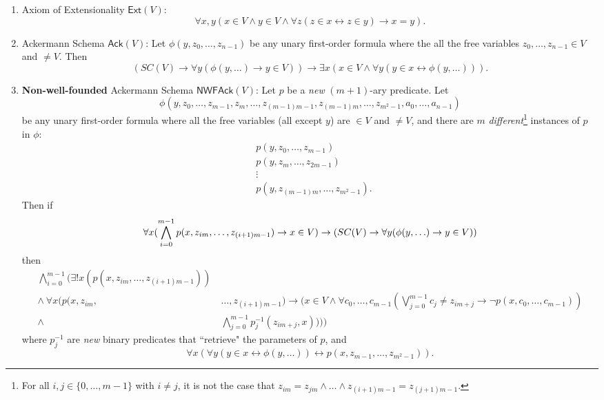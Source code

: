 \documentclass{article}
\begin{document}
\begin{enumerate}
	\item Axiom of Extensionality $\textsf{Ext}(V)$: $$\forall x, y (x \in V \wedge y \in V \wedge \forall z(z\in x \leftrightarrow z \in y) \rightarrow x = y).$$
	\item Ackermann Schema $\textsf{Ack}(V)$: Let $\phi(y, z_0, \ldots, z_{n-1})$ be any unary first-order formula where the all the free variables $z_0, \ldots, z_{n-1} \in V$ and $\ne V$. Then $$(SC(V) \rightarrow \forall y(\phi(y, \ldots) \rightarrow y \in V)) \rightarrow \exists x(x \in V \wedge \forall y(y \in x \leftrightarrow \phi(y, \ldots))).$$
    \item \textbf{Non-well-founded} Ackermann Schema $\textsf{NWFAck}(V)$: Let $p$ be a \textit{new} $(m+1)$-ary predicate. Let $$\phi(y, z_0, \ldots, z_{m-1}, z_{m}, \ldots, z_{(m-1)m-1}, z_{(m-1)m}, \ldots, z_{m^2-1}, a_0, \ldots, a_{n-1})$$ be any unary first-order formula where all the free variables (all except $y$) are $\in V$ and $\ne V$, and there are $m$ \textit{different}\footnote{For all $i,j \in \{0, \ldots, m-1\}$ with $i \ne j$, it is not the case that $z_{im} = z_{jm} \wedge \ldots \wedge z_{(i+1)m-1} = z_{(j+1)m-1}$.} instances of $p$ in $\phi$:
\begin{align*}
&p(y, z_0, \ldots, z_{m-1}) \\ &p(y, z_m, \ldots, z_{2m-1}) \\ &\vdots \\ &p(y, z_{(m-1)m}, \ldots, z_{m^2-1}).
\end{align*}
Then if
$$\forall x(\bigwedge_{i=0}^{m-1}{p(x, z_{im}, \ldots, z_{(i+1)m-1})}\rightarrow x \in V) \rightarrow \\ (SC(V) \rightarrow \forall y(\phi(y, \ldots) \rightarrow y \in V))$$
then
\begin{align*}
\bigwedge_{i=0}^{m-1}\Big(\exists!x(p(x, z_{im}, \ldots, z_{(i+1)m-1}))\ &  \\ \wedge\ \forall x(p(x, z_{im}, & \ldots, z_{(i+1)m-1}) \rightarrow (x \in V \wedge \forall c_0, \ldots, c_{m-1} (\bigvee_{j=0}^{m-1} {c_j \ne z_{im+j}} \rightarrow \neg p(x, c_0, \ldots, c_{m-1})) \\ \wedge & \bigwedge_{j=0}^{m-1} p_j^{-1}(z_{im+j}, x)))\Big)
\end{align*}
where $p_j^{-1}$ are \textit{new} binary predicates that ``retrieve" the parameters of $p$,
and
$$\forall x (\forall y (y \in x \leftrightarrow \phi(y, \ldots)) \leftrightarrow p(x, z_{m-1}, \ldots, z_{m^2-1})).$$
\end{enumerate}
\end{document}
